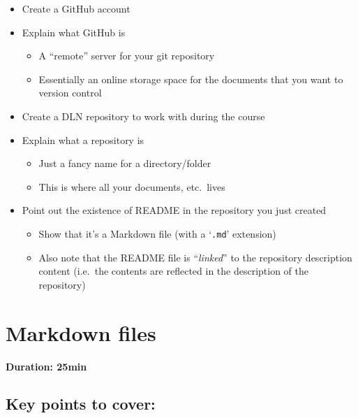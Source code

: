\documentclass[a4paper, 12pt, oneside]{report} %
\begin{document}
\begin{itemize}
	\item Create a GitHub account
	\item Explain what GitHub is
		\begin{itemize}
			\item A ``remote'' server for your git repository
			\item Essentially an online storage space for the documents that you want to version control
		\end{itemize}
	\item Create a DLN repository to work with during the course
	\item Explain what a repository is
		\begin{itemize}
			\item Just a fancy name for a directory/folder
			\item This is where all your documents, etc.\ lives
		\end{itemize}
	\item Point out the existence of README in the repository you just created
		\begin{itemize}
			\item Show that it's a Markdown file (with a `\texttt{.md}' extension)
			\item Also note that the README file is ``\textit{linked}'' to the repository description content (i.e.\ the contents are reflected in the description of the repository)
		\end{itemize}
\end{itemize}


\section{Markdown files}
\label{sec:Markdown_files}

{\bfseries Duration: 25min}

\subsection*{Key points to cover:}
\end{document}
